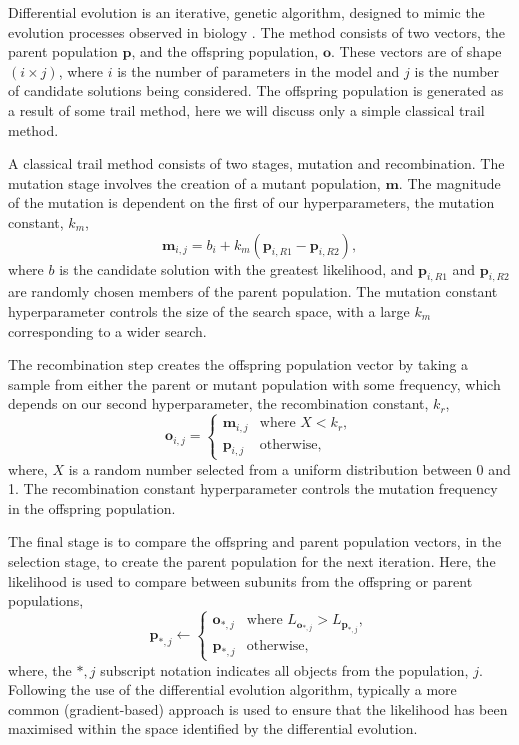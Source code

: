 \documentclass[
 reprint,
 superscriptaddress,
 amsmath,amssymb,
 aps,
]{revtex4-1}
\begin{document}
Differential evolution is an iterative, genetic algorithm, designed to mimic the evolution processes observed in biology \cite{holland_adaptation_1992}.
The method consists of two vectors, the parent population $\mathbf{p}$, and the offspring population, $\mathbf{o}$. 
These vectors are of shape $(i \times j)$, where $i$ is the number of parameters in the model and $j$ is the number of candidate solutions being considered. 
The offspring population is generated as a result of some trail method, here we will discuss only a simple classical trail method.

A classical trail method consists of two stages, mutation and recombination. 
The mutation stage involves the creation of a mutant population, $\mathbf{m}$. 
The magnitude of the mutation is dependent on the first of our hyperparameters, the mutation constant, $k_m$, 
%
\begin{equation}
    \mathbf{m}_{i,j} = b_i + k_m (\mathbf{p}_{i, R1} - \mathbf{p}_{i, R2}),
\end{equation}
%
where $b$ is the candidate solution with the greatest likelihood, and $\mathbf{p}_{i, R1}$ and $\mathbf{p}_{i, R2}$ are randomly chosen members of the parent population. 
The mutation constant hyperparameter controls the size of the search space, with a large $k_m$ corresponding to a wider search. 

The recombination step creates the offspring population vector by taking a sample from either the parent or mutant population with some frequency, which depends on our second hyperparameter, the recombination constant, $k_r$,
%
\begin{equation}
    \mathbf{o}_{i, j} = 
    \begin{cases}
        \mathbf{m}_{i, j} & \text{where } X < k_r,\\
        \mathbf{p}_{i, j} & \text{otherwise},
    \end{cases}
\end{equation}
%
where, $X$ is a random number selected from a uniform distribution between 0 and 1. 
The recombination constant hyperparameter controls the mutation frequency in the offspring population. 

The final stage is to compare the offspring and parent population vectors, in the selection stage, to create the parent population for the next iteration. 
Here, the likelihood is used to compare between subunits from the offspring or parent populations, 
%
\begin{equation}
    \mathbf{p}_{*, j} \leftarrow 
    \begin{cases}
        \mathbf{o}_{*, j} & \text{where } L_{\mathbf{o}_{*, j}} > L_{\mathbf{p}_{*, j}},\\
        \mathbf{p}_{*, j} & \text{otherwise},
    \end{cases}
\end{equation}
%
where, the $*, j$ subscript notation indicates all objects from the population, $j$.
Following the use of the differential evolution algorithm, typically a more common (gradient-based) approach is used to ensure that the likelihood has been maximised within the space identified by the differential evolution.
\end{document}
